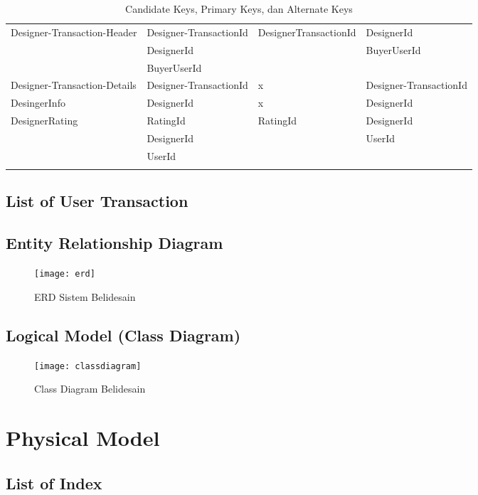 \begin{longtable}{| p{3cm} | p{3.2cm} | l | p{3.2cm} |}
		Designer-Transaction-Header	& Designer-TransactionId	& DesignerTransactionId	& DesignerId			\\
									& DesignerId			& 						& BuyerUserId			\\
									& BuyerUserId			&						& 						\\ \hline
		Designer-Transaction-Details	& Designer-TransactionId	& x						& Designer-TransactionId	\\ \hline
		DesingerInfo				& DesignerId			& x						& DesignerId			\\ \hline
		DesignerRating				& RatingId				& RatingId				& DesignerId			\\
									& DesignerId			&						& UserId				\\
									& UserId				&						&						\\ \hline
									
		\caption{Candidate Keys, Primary Keys, dan Alternate Keys}
	\end{longtable}

\subsection{List of User Transaction}
\begin{center}
\end{center}

\subsection{Entity Relationship Diagram}
\begin{figure}[h]
	\centering
	\texttt{[image: erd]}
	\caption{ERD Sistem Belidesain}
\end{figure}

\subsection{Logical Model (Class Diagram)}
\begin{figure}
	\centering
	\texttt{[image: classdiagram]}
	\caption{Class Diagram Belidesain}
\end{figure}


\section{Physical Model}
\subsection{List of Index}
